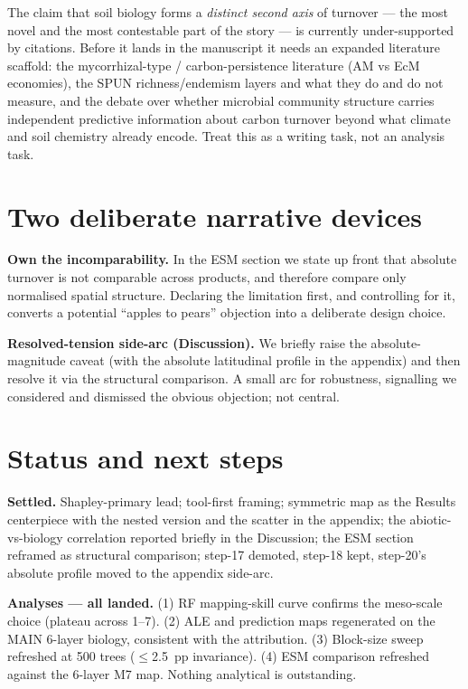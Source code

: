 \documentclass[11pt]{article}
\begin{document}
The claim that soil biology forms a \emph{distinct second axis} of turnover --- the
most novel and the most contestable part of the story --- is currently
under-supported by citations. Before it lands in the manuscript it needs an expanded
literature scaffold: the mycorrhizal-type / carbon-persistence literature (AM vs EcM
economies), the SPUN richness/endemism layers and what they do and do not measure,
and the debate over whether microbial community structure carries independent
predictive information about carbon turnover beyond what climate and soil chemistry
already encode. Treat this as a writing task, not an analysis task.

\section{Two deliberate narrative devices}

\textbf{Own the incomparability.} In the ESM section we state up front that absolute
turnover is not comparable across products, and therefore compare only normalised
spatial structure. Declaring the limitation first, and controlling for it, converts a
potential ``apples to pears'' objection into a deliberate design choice.

\textbf{Resolved-tension side-arc (Discussion).} We briefly raise the
absolute-magnitude caveat (with the absolute latitudinal profile in the appendix) and
then resolve it via the structural comparison. A small arc for robustness, signalling
we considered and dismissed the obvious objection; not central.

\section{Status and next steps}

\textbf{Settled.} Shapley-primary lead; tool-first framing; symmetric map as the
Results centerpiece with the nested version and the scatter in the appendix; the
abiotic-vs-biology correlation reported briefly in the Discussion; the ESM section
reframed as structural comparison; step-17 demoted, step-18 kept, step-20's absolute
profile moved to the appendix side-arc.

\textbf{Analyses --- all landed.} (1) RF mapping-skill curve confirms the meso-scale
choice (plateau across 1--7\textdegree). (2) ALE and prediction maps regenerated on
the MAIN 6-layer biology, consistent with the attribution. (3) Block-size sweep
refreshed at 500 trees ($\le$2.5~pp invariance). (4) ESM comparison refreshed against
the 6-layer M7 map. Nothing analytical is outstanding.
\end{document}
